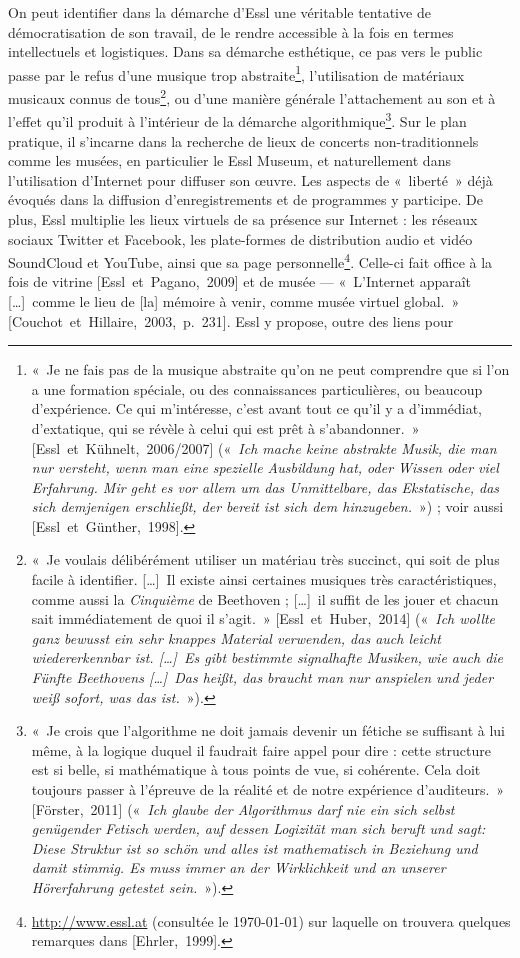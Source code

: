 \documentclass[a4paper,12pt]{article}
\newcommand{\guill}[1]{«~#1~»}
\newcommand{\tpp}[0]{[\dots]}
\newcommand{\cicite}[1]{{\footnotesize[#1]}}
\begin{document}
On peut identifier dans la démarche d'Essl une véritable tentative de démocratisation de son travail, de le rendre accessible à la fois en termes intellectuels et logistiques. Dans sa démarche esthétique, ce pas vers le public passe par le refus d'une musique trop abstraite\footnote{\guill{Je ne fais pas de la musique abstraite qu'on ne peut comprendre que si l'on a une formation spéciale, ou des connaissances particulières, ou beaucoup d'expérience. Ce qui m'intéresse, c'est avant tout ce qu'il y a d'immédiat, d'extatique, qui se révèle à celui qui est prêt à s'abandonner.} \cicite{Essl~et~Kühnelt,~2006/2007} (\guill{\emph{Ich mache keine abstrakte Musik, die man nur versteht, wenn man eine spezielle Ausbildung hat, oder Wissen oder viel Erfahrung. Mir geht es vor allem um das Unmittelbare, das Ekstatische, das sich demjenigen erschließt, der bereit ist sich dem hinzugeben.}}) ; voir aussi \cicite{Essl~et~Günther,~1998}.}, l'utilisation de matériaux musicaux connus de tous\footnote{\guill{Je voulais délibérément utiliser un matériau très succinct, qui soit de plus facile à identifier. \tpp~Il existe ainsi certaines musiques très caractéristiques, comme aussi la \emph{Cinquième} de Beethoven ; \tpp~il suffit de les jouer et chacun sait immédiatement de quoi il s'agit.} \cicite{Essl~et~Huber,~2014} (\guill{\emph{Ich wollte ganz bewusst ein sehr knappes Material verwenden, das auch leicht wiedererkennbar ist. \tpp~Es gibt bestimmte signalhafte Musiken, wie auch die Fünfte Beethovens \tpp~Das heißt, das braucht man nur anspielen und jeder weiß sofort, was das ist.}}).}, ou d'une manière générale l'attachement au son et à l'effet qu'il produit à l'intérieur de la démarche algorithmique\footnote{\guill{Je crois que l'algorithme ne doit jamais devenir un fétiche se suffisant à lui même, à la logique duquel il faudrait faire appel pour dire : cette structure est si belle, si mathématique à tous points de vue, si cohérente. Cela doit toujours passer à l'épreuve de la réalité et de notre expérience d'auditeurs.} \cicite{Förster,~2011} (\guill{\emph{Ich glaube der Algorithmus darf nie ein sich selbst genügender Fetisch werden, auf dessen Logizität man sich beruft und sagt\!: Diese Struktur ist so schön und alles ist mathematisch in Beziehung und damit stimmig. Es muss immer an der Wirklichkeit und an unserer Hörerfahrung getestet sein.}}).}. Sur le plan pratique, il s'incarne dans la recherche de lieux de concerts non-traditionnels comme les musées, en particulier le Essl Museum, et naturellement dans l'utilisation d'Internet pour diffuser son œuvre. Les aspects de \guill{liberté} déjà évoqués dans la diffusion d'enregistrements et de programmes y participe. De plus, Essl multiplie les lieux virtuels de sa présence sur Internet : les réseaux sociaux Twitter et Facebook, les plate-formes de distribution audio et vidéo SoundCloud et YouTube, ainsi que sa page personnelle\footnote{\href{http://www.essl.at}{http://www.essl.at} (consultée le \today) sur laquelle on trouvera quelques remarques dans \cicite{Ehrler,~1999}.}. Celle-ci fait office à la fois de vitrine \cicite{Essl~et~Pagano,~2009} et de musée --- \guill{L'Internet apparaît \tpp~comme le lieu de [la] mémoire à venir, comme musée virtuel global.} \cicite{Couchot~et~Hillaire,~2003,~p.~231}. Essl y propose, outre des liens pour 
\end{document}
